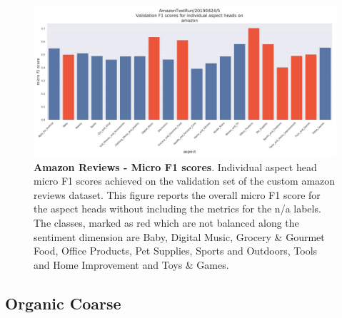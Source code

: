 \begin{figure}[H]
	\centering
	\includegraphics[width=\textwidth]{figures/08_appendix/08_am_headResults}
	\caption{\textbf{Amazon Reviews - Micro F1 scores}. Individual aspect head micro F1 scores achieved on the validation set of the custom amazon reviews dataset. This figure reports the overall micro F1 score for the aspect heads without including the metrics for the n/a labels. The classes, marked as red which are not balanced along the sentiment dimension are Baby, Digital Music, Grocery \& Gourmet Food, Office Products, Pet Supplies, Sports and Outdoors, Tools and Home Improvement and Toys \& Games.}
	\label{fig:08_am_val_f1}
\end{figure}

\subsection{Organic Coarse}

